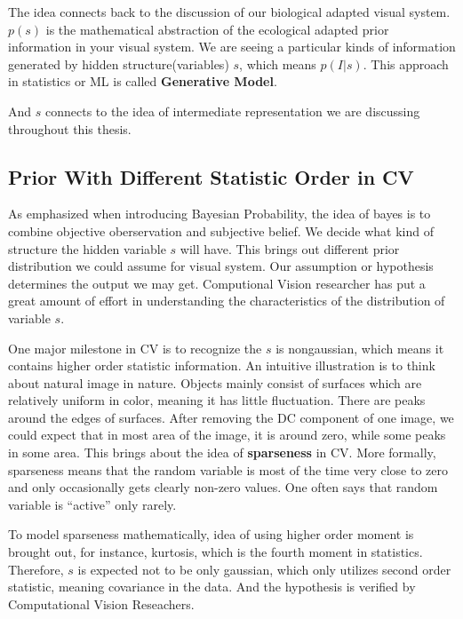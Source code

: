 \documentclass[a4paper]{book}
\begin{document}
    The idea connects back to the discussion of our biological adapted
    visual system. $p(s)$ is the mathematical abstraction of the
    ecological adapted prior information in your visual system. We are
    seeing a particular kinds of information generated by hidden
    structure(variables) $s$, which means $p(I|s)$. This approach in
    statistics or ML is called \textbf{Generative Model}. 

    And $s$ connects to the idea of intermediate representation we are
    discussing throughout this thesis.

    \subsection{Prior With Different Statistic Order in CV}
    As emphasized when introducing Bayesian Probability, the idea of
    bayes is to combine objective oberservation and subjective belief. We
    decide what kind of structure the hidden variable $s$ will have.
    This brings out different prior distribution we could assume for
    visual system. Our assumption or hypothesis determines the output we
    may get. Computional Vision researcher has put a great amount
    of effort in understanding the characteristics of the distribution
    of variable $s$.

    One major milestone in CV is to recognize the $s$ is nongaussian,
    which means it contains higher order statistic information. An
    intuitive illustration is to think about natural image in nature.
    Objects mainly consist of surfaces which are relatively uniform in
    color, meaning it has little fluctuation. There are peaks around the
    edges of surfaces. After removing the DC component of one image, we
    could expect that in most area of the image, it is around zero,
    while some peaks in some area. This brings about the idea of
    \textbf{sparseness} in CV. More formally, sparseness means that the
    random variable is most of the time very close to zero and only
    occasionally gets clearly non-zero values. One often says that
    random variable is ``active'' only rarely.

    To model sparseness mathematically, idea of using higher order
    moment is brought out, for instance, kurtosis, which is the fourth
    moment in statistics.  Therefore, $s$ is expected not to be only
    gaussian, which only utilizes second order statistic, meaning
    covariance in the data. And the hypothesis is verified by
    Computational Vision Reseachers.
\end{document}
